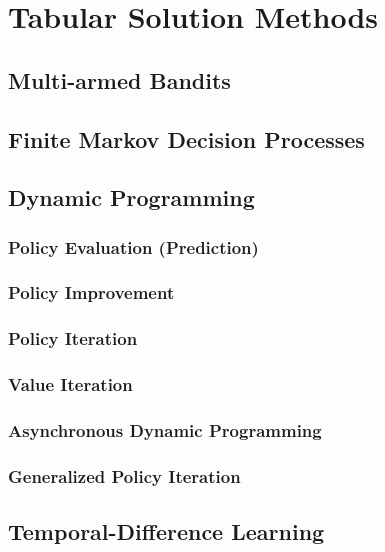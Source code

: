 \documentclass[a4paper,chapter,microtype,fleqn,oneside]{oblivoir}
\begin{document}
\tableofcontents



\part{Tabular Solution Methods}\label{pt:tabular-solution-methods}

\chapter{Multi-armed Bandits}\label{ch:multi-armed-bandits}

\chapter{Finite Markov Decision Processes}\label{ch:finite-markov-decision-processes}

\chapter{Dynamic Programming}\label{ch:dynamic-programming}
\section{Policy Evaluation (Prediction)}
\section{Policy Improvement}\label{sec:policy-improvement}
\section{Policy Iteration}
\section{Value Iteration}
\section{Asynchronous Dynamic Programming}
\section{Generalized Policy Iteration}\label{sec:generalized-policy-iteration}



\chapter{Temporal-Difference Learning}\label{ch:temporal-difference-learning}
\end{document}
